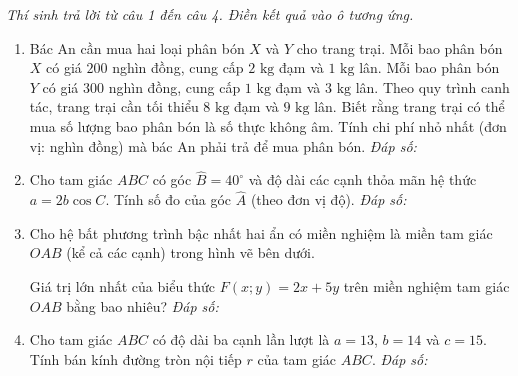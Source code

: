 \documentclass[12pt,a4paper]{article}
\newcommand{\parttitle}[1]{\par\vspace{1.5pt}{\large\bfseries\color{ink}#1}\par\vspace{0.5pt}}
\newcommand{\answerbox}{\hfill\textit{Đáp số:}\ \fbox{\rule{0pt}{10pt}\hspace{2.2cm}}}
\begin{document}
\parttitle{PHẦN III. Trắc nghiệm trả lời ngắn}
\textit{Thí sinh trả lời từ câu 1 đến câu 4. Điền kết quả vào ô tương ứng.}
\begin{enumerate}
\item Bác An cần mua hai loại phân bón $X$ và $Y$ cho trang trại. Mỗi bao phân bón $X$ có giá $200$ nghìn đồng, cung cấp $2\text{ kg}$ đạm và $1\text{ kg}$ lân. Mỗi bao phân bón $Y$ có giá $300$ nghìn đồng, cung cấp $1\text{ kg}$ đạm và $3\text{ kg}$ lân. Theo quy trình canh tác, trang trại cần tối thiểu $8\text{ kg}$ đạm và $9\text{ kg}$ lân. Biết rằng trang trại có thể mua số lượng bao phân bón là số thực không âm. Tính chi phí nhỏ nhất (đơn vị: nghìn đồng) mà bác An phải trả để mua phân bón.
\answerbox

\item Cho tam giác $ABC$ có góc $\widehat{B} = 40^\circ$ và độ dài các cạnh thỏa mãn hệ thức $a = 2b\cos C$. Tính số đo của góc $\widehat{A}$ (theo đơn vị độ).
\answerbox

\item Cho hệ bất phương trình bậc nhất hai ẩn có miền nghiệm là miền tam giác $OAB$ (kể cả các cạnh) trong hình vẽ bên dưới.

\par{}\vspace{1pt}

Giá trị lớn nhất của biểu thức $F(x; y) = 2x + 5y$ trên miền nghiệm tam giác $OAB$ bằng bao nhiêu?
\answerbox

\item Cho tam giác $ABC$ có độ dài ba cạnh lần lượt là $a = 13$, $b = 14$ và $c = 15$. Tính bán kính đường tròn nội tiếp $r$ của tam giác $ABC$.
\answerbox
\end{enumerate}
\end{document}
